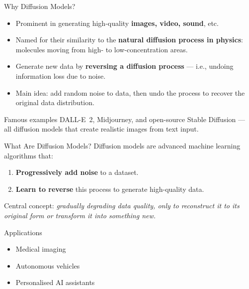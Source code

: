 \documentclass[aspectratio=169,10pt]{beamer}
\begin{document}
\begin{frame}{Why Diffusion Models?}
  \begin{itemize}
    \item Prominent in generating high-quality \textbf{images, video, sound}, etc.
    \item Named for their similarity to the \textbf{natural diffusion process in
          physics}: molecules moving from high- to low-concentration areas.
    \item Generate new data by \textbf{reversing a diffusion process} —
          i.e., undoing information loss due to noise.
    \item Main idea: add random noise to data, then undo the process to
          recover the original data distribution.
  \end{itemize}
  \vspace{4pt}
  \begin{alertblock}{Famous examples}
    DALL-E~2, Midjourney, and open-source Stable Diffusion — all diffusion models
    that create realistic images from text input.
  \end{alertblock}
\end{frame}

\begin{frame}{What Are Diffusion Models?}
  Diffusion models are advanced machine learning algorithms that:
  \begin{enumerate}
    \item \textbf{Progressively add noise} to a dataset.
    \item \textbf{Learn to reverse} this process to generate high-quality data.
  \end{enumerate}
  \vspace{6pt}
  Central concept: \emph{gradually degrading data quality, only to reconstruct
  it to its original form or transform it into something new.}
  \vspace{6pt}
  \begin{block}{Applications}
    \begin{itemize}
      \item Medical imaging
      \item Autonomous vehicles
      \item Personalised AI assistants
    \end{itemize}
  \end{block}
\end{frame}
\end{document}
